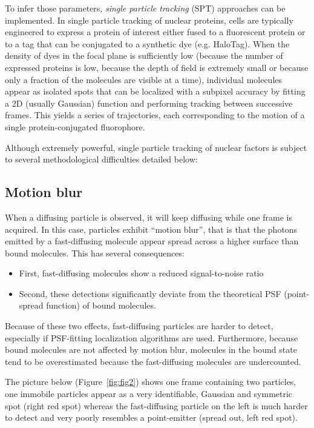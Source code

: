 To infer those parameters, \textit{single particle tracking} (SPT) approaches can be implemented. In single particle tracking of nuclear proteins, cells are typically engineered to express a protein of interest either fused to a fluorescent protein or to a tag that can be conjugated to a synthetic dye (e.g. HaloTag). When the density of dyes in the focal plane is sufficiently low (because the number of expressed proteins is low, because the depth of field is extremely small or because only a fraction of the molecules are visible at a time), individual molecules appear as isolated spots that can be localized with a subpixel accuracy by fitting a 2D (usually Gaussian) function and performing tracking between successive frames. This yields a series of trajectories, each corresponding to the motion of a single protein-conjugated fluorophore.

Although extremely powerful, single particle tracking of nuclear factors is subject to several methodological difficulties detailed below:

\subsection{Motion blur}
When a diffusing particle is observed, it will keep diffusing while one frame is acquired. In this case, particles exhibit ``motion blur'', that is that the photons emitted by a fast-diffusing molecule appear spread across a higher surface than bound molecules. This has several consequences:

\begin{itemize}
\item{First, fast-diffusing molecules show a reduced signal-to-noise ratio}
\item{Second, these detections significantly deviate from the theoretical PSF (point-spread function) of bound molecules.}
\end{itemize}

Because of these two effects, fast-diffusing particles are harder to detect, especially if PSF-fitting localization algorithms are used. Furthermore, because bound molecules are not affected by motion blur, molecules in the bound state tend to be overestimated because the fast-diffusing molecules are undercounted.

The picture below (Figure~\ref{fig:fig2}) shows one frame containing two particles, one immobile particles appear as a very identifiable, Gaussian and symmetric spot (right red spot) whereas the fast-diffusing particle on the left is much harder to detect and very poorly resembles a point-emitter (spread out, left red spot).


